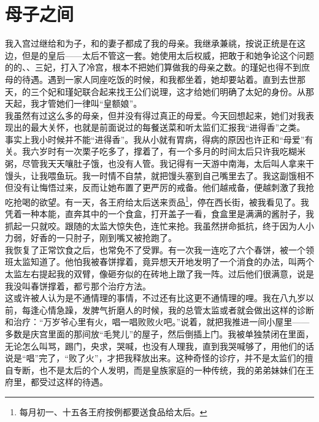\fancyhead[RO]{} %
\fancyhead[LE]{} %
\chapter*{母子之间}
\thispagestyle{empty}
我入宫过继给和为子，和的妻子都成了我的母亲。我继承兼祧，按说正统是在这边，但是的皇后——太后不管这一套。她使用太后权威，把敢于和她争论这个问题的的、、三妃，打入了冷宫，根本不把她们算做我的母亲之数。的瑾妃也得不到庶母的待遇。遇到一家人同座吃饭的时候，和我都坐着，她却要站着。直到去世那天，的三个妃和瑾妃联合起来找王公们说理，这才给她们明确了太妃的身份。从那天起，我才管她们一律叫“皇额娘”。\\

我虽然有过这么多的母亲，但并没有得过真正的母爱。今天回想起来，她们对我表现出的最大关怀，也就是前面说过的每餐送菜和听太监们汇报我“进得香”之类。\\

事实上我小时候并不能“进得香”。我从小就有胃病，得病的原因也许正和“母爱”有关。我六岁时有一次栗子吃多了，撑着了，有一个多月的时间太后只许我吃糊米粥，尽管我天天嚷肚子饿，也没有人管。我记得有一天游中南海，太后叫人拿来干馒头，让我喂鱼玩。我一时情不自禁，就把馒头塞到自己嘴里去了。我这副饿相不但没有让悔悟过来，反而让她布置了更严厉的戒备。他们越戒备，便越刺激了我抢吃抢喝的欲望。有一天，各王府给太后送来贡品\footnote{每月初一、十五各王府按例都要送食品给太后。}，停在西长街，被我看见了。我凭着一种本能，直奔其中的一个食盒，打开盖子一看，食盒里是满满的酱肘子，我抓起一只就咬。跟随的太监大惊失色，连忙来抢。我虽然拼命抵抗，终于因为人小力弱，好香的一只肘子，刚到嘴又被抢跑了。\\

我恢复了正常饮食之后，也常免不了受罪。有一次我一连吃了六个春饼，被一个领班太监知道了。他怕我被春饼撑着，竟异想天开地发明了一个消食的办法，叫两个太监左右提起我的双臂，像砸夯似的在砖地上蹾了我一阵。过后他们很满意，说是我没叫春饼撑着，都亏那个治疗方法。\\

这或许被人认为是不通情理的事情，不过还有比这更不通情理的哩。我在八九岁以前，每逢心情急躁，发脾气折磨人的时候，我的总管太监或者就会做出这样的诊断和治疗：“万岁爷心里有火，唱一唱败败火吧。”说着，就把我推进一间小屋里——多数是庆宫里面的那间放“毛凳儿”的屋子，然后倒插上门。我被单独禁闭在里面，无论怎么叫骂，踢门，央求，哭喊，也没有人理我，直到我哭喊够了，用他们的话说是“唱”完了，“败了火”，才把我释放出来。这种奇怪的诊疗，并不是太监们的擅自专断，也不是太后的个人发明，而是皇族家庭的一种传统，我的弟弟妹妹们在王府里，都受过这样的待遇。\\

